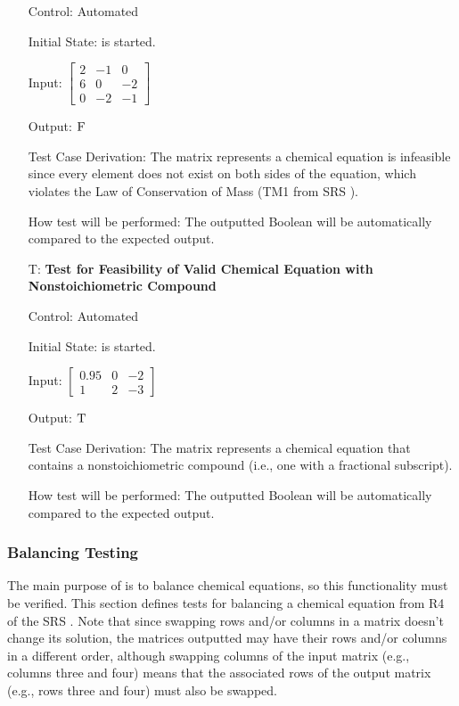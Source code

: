 \documentclass[12pt, titlepage]{article}
\newcounter{testnum} %
\begin{document}
\begin{enumerate}
    Control: Automated

    Initial State: \progname{} is started.

    Input: $\begin{bmatrix}
        2 & -1 & 0  \\
        6 & 0  & -2 \\
        0 & -2 & -1
      \end{bmatrix}$

    Output: $\textsc{F}$

    Test Case Derivation: The matrix represents a chemical equation is
    infeasible since
    every element does not exist on both sides of the equation, which violates
    the Law of Conservation of Mass (TM1 from SRS ).

    How test will be performed: The outputted Boolean will be automatically
    compared to the expected output.

  \item[T\refstepcounter{testnum}\thetestnum \label{test_nonstoich_valid_feas}:]
    \textbf{Test for Feasibility of Valid Chemical Equation with
      Nonstoichiometric Compound}

    Control: Automated

    Initial State: \progname{} is started.

    Input:
    $\begin{bmatrix}
        0.95 & 0 & -2 \\
        1    & 2 & -3
      \end{bmatrix}$

    Output: $\textsc{T}$

    Test Case Derivation: The matrix represents a chemical equation that
    contains a nonstoichiometric compound (i.e., one with a fractional
    subscript).

    How test will be performed: The outputted Boolean will be automatically
    compared to the expected output.

\end{enumerate}

\subsubsection{Balancing Testing}

The main purpose of \progname{} is to balance chemical equations, so this
functionality must be verified. This section defines tests for balancing a
chemical equation from
R4 of the SRS . 
Note that since swapping rows and/or columns in a matrix doesn't change its
solution, the matrices outputted may have their rows and/or columns in a
different order, although swapping columns of the input matrix (e.g., columns
three and four) means that the associated rows of the output matrix (e.g., rows
three and four) must also be swapped.
\end{document}
